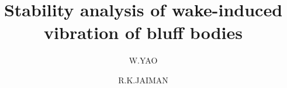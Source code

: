 \usepackage{environ}

\usepackage{xcolor}
\usepackage{tikz}

\newcommand{\reddashdot}{\raisebox{2pt}{\tikz{\draw[red,dashdotted,line width=1.2pt](0,0) -- (5mm,0);}}}
\newcommand{\bluedashdot}{\raisebox{2pt}{\tikz{\draw[blue,dashdotted,line width=1.2pt](0,0) -- (5mm,0);}}}
\newcommand{\greendashdot}{\raisebox{2pt}{\tikz{\draw[green,dashdotted,line width=1.2pt](0,0) -- (5mm,0);}}}
\newcommand{\greendash}{\raisebox{2pt}{\tikz{\draw[green,dashed,line width=1.2pt](0,0) -- (5mm,0);}}}
\newcommand{\greensolid}{\raisebox{2pt}{\tikz{\draw[green,solid,line width=1.2pt](0,0) -- (5mm,0);}}}
\newcommand{\reddash}{\raisebox{2pt}{\tikz{\draw[red,dashed,line width=1.2pt](0,0) -- (5mm,0);}}}
\newcommand{\reddot}{\raisebox{2pt}{\tikz{\draw[red,dotted,line width=1.2pt](0,0) -- (5mm,0);}}}
\newcommand{\bluedash}{\raisebox{2pt}{\tikz{\draw[blue,dashed,line width=1.2pt](0,0) -- (5mm,0);}}}
\newcommand{\blackdash}{\raisebox{2pt}{\tikz{\draw[black,dashed,line width=1.2pt](0,0) -- (5mm,0);}}}
%
%
%
%
%


\title{Stability analysis of wake-induced vibration of bluff bodies %
}


\author{W.YAO         \and
        R.K.JAIMAN %
}



